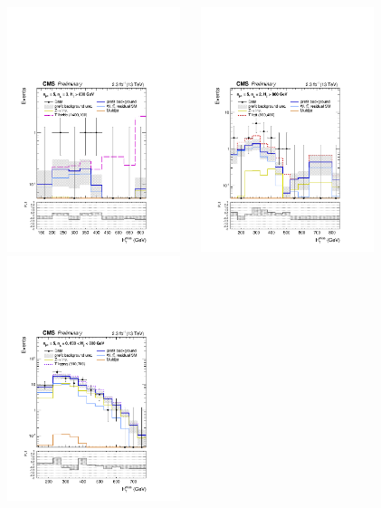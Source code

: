 \begin{figure}[tbhp]
  \begin{center}
    \includegraphics[width=0.45\textwidth]{figures/mht_shapes/v0/postFitShape_ge3b_ge5j_800_Inf_prefit_T1bbbb_1400_100} ~~
    \includegraphics[width=0.45\textwidth]{figures/mht_shapes/v0/postFitShape_eq2b_ge5j_800_Inf_prefit_T1tttt_800_400} \\
    \includegraphics[width=0.45\textwidth]{figures/mht_shapes/v0/postFitShape_eq0b_ge5j_600_800_prefit_T1qqqq_900_700}

\end{center}
\end{figure}
